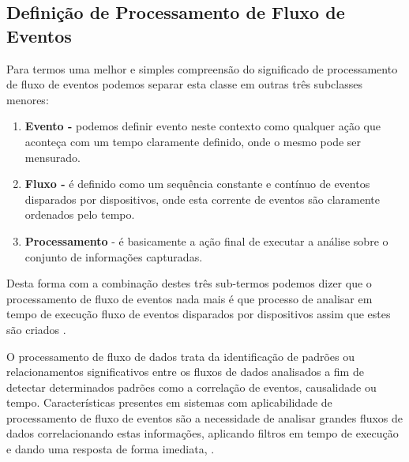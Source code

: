 \documentclass[tid,table]{texufpel} %
\begin{document}

\subsection{Definição de Processamento de Fluxo de Eventos}

Para termos uma melhor e simples compreensão do significado de processamento de fluxo de eventos podemos separar esta classe em outras três subclasses menores:
\begin{enumerate}
	\item  \textbf{Evento -} podemos definir evento neste contexto como qualquer ação que aconteça com um tempo claramente definido, onde o mesmo pode ser mensurado.  
	
	\item  \textbf{Fluxo -} é definido como um sequência constante e contínuo de eventos disparados por dispositivos, onde esta corrente de eventos são claramente ordenados pelo tempo.
	
	\item  \textbf{Processamento} - é basicamente a ação final de executar a análise sobre o conjunto de informações capturadas.
\end{enumerate}
Desta forma com a combinação destes três sub-termos podemos dizer que o processamento de fluxo de eventos nada mais é que processo de analisar em tempo de execução fluxo de eventos disparados por dispositivos assim que estes são criados \cite{dayarathna2018recent}. 

O processamento de fluxo de dados trata da identificação de padrões ou relacionamentos significativos entre os fluxos de dados analisados a fim de detectar determinados padrões como a correlação de eventos, causalidade ou tempo.
Características presentes em sistemas com aplicabilidade de processamento de fluxo de eventos são a necessidade de analisar grandes fluxos de dados correlacionando estas informações, aplicando filtros em tempo de execução e dando uma resposta de forma imediata, \cite{appel2013event}.


\end{document}
